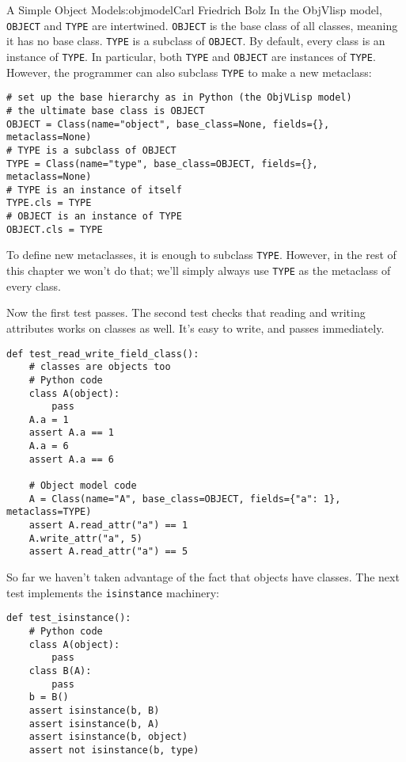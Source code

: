 \begin{aosachapter}{A Simple Object Model}{s:objmodel}{Carl Friedrich Bolz}
In the ObjVlisp model, \texttt{OBJECT} and \texttt{TYPE} are
intertwined. \texttt{OBJECT} is the base class of all classes, meaning
it has no base class. \texttt{TYPE} is a subclass of \texttt{OBJECT}. By
default, every class is an instance of \texttt{TYPE}. In particular,
both \texttt{TYPE} and \texttt{OBJECT} are instances of \texttt{TYPE}.
However, the programmer can also subclass \texttt{TYPE} to make a new
metaclass:

\begin{verbatim}
# set up the base hierarchy as in Python (the ObjVLisp model)
# the ultimate base class is OBJECT
OBJECT = Class(name="object", base_class=None, fields={}, metaclass=None)
# TYPE is a subclass of OBJECT
TYPE = Class(name="type", base_class=OBJECT, fields={}, metaclass=None)
# TYPE is an instance of itself
TYPE.cls = TYPE
# OBJECT is an instance of TYPE
OBJECT.cls = TYPE
\end{verbatim}

To define new metaclasses, it is enough to subclass \texttt{TYPE}.
However, in the rest of this chapter we won't do that; we'll simply
always use \texttt{TYPE} as the metaclass of every class.


Now the first test passes. The second test checks that reading and
writing attributes works on classes as well. It's easy to write, and
passes immediately.

\begin{verbatim}
def test_read_write_field_class():
    # classes are objects too
    # Python code
    class A(object):
        pass
    A.a = 1
    assert A.a == 1
    A.a = 6
    assert A.a == 6

    # Object model code
    A = Class(name="A", base_class=OBJECT, fields={"a": 1}, metaclass=TYPE)
    assert A.read_attr("a") == 1
    A.write_attr("a", 5)
    assert A.read_attr("a") == 5
\end{verbatim}

\label{isinstance-checking}

So far we haven't taken advantage of the fact that objects have classes.
The next test implements the \texttt{isinstance} machinery:

\begin{verbatim}
def test_isinstance():
    # Python code
    class A(object):
        pass
    class B(A):
        pass
    b = B()
    assert isinstance(b, B)
    assert isinstance(b, A)
    assert isinstance(b, object)
    assert not isinstance(b, type)


\end{verbatim}
\end{aosachapter}
